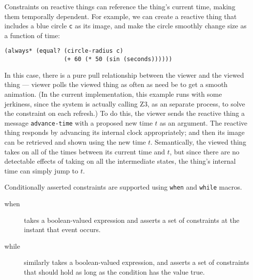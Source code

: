 \documentclass{sigplanconf}
\begin{document}
Constraints on reactive things can reference the thing's current time,
making them temporally dependent.  For example, we can create a reactive
thing that includes a blue circle \verb|c| as its image, and make the
circle smoothly change size as a function of time:

\begin{verbatim}
(always* (equal? (circle-radius c)
                 (+ 60 (* 50 (sin (seconds))))))
\end{verbatim}

In this case, there is a pure pull relationship between the viewer and
the viewed thing --- viewer polls the viewed thing as often as need be to
get a smooth animation.  (In the current implementation, this example runs
with some jerkiness, since the system is actually calling Z3, as an
separate process, to solve the constraint on each refresh.)  To do this,
the viewer sends the reactive thing a message \verb|advance-time| with a
proposed new time $t$ as an argument.  The reactive thing responds by
advancing its internal clock appropriately; and then its image can be
retrieved and shown using the new time $t$\@.  Semantically, the viewed
thing takes on all of the times between its current time and $t$, but since
there are no detectable effects of taking on all the intermediate states,
the thing's internal time can simply jump to $t$.

Conditionally asserted constraints are supported using \verb|when| and
\verb|while| macros.

\begin{description}
    
\item[when] takes a boolean-valued expression and asserts a set of
  constraints at the instant that event occurs.

\item[while] similarly takes a boolean-valued expression, and asserts a set
  of constraints that should hold as long as the condition has the value
  true.



\end{description}
\end{document}

